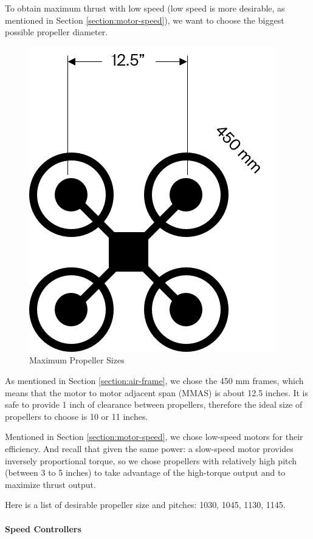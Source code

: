 To obtain maximum thrust with low speed (low speed is more desirable, as mentioned in Section \ref{section:motor-speed}), we want to choose the biggest possible propeller diameter.

\begin{figure}[H]
    \centering
    \includegraphics[scale=0.5]{img/framepropsize}
    \caption{Maximum Propeller Sizes}
    \label{fig:framepropsize}
\end{figure}

As mentioned in Section \ref{section:air-frame}, we chose the 450 mm frames, which means that the motor to motor 
adjacent span (MMAS) is about 12.5 inches. It is safe to provide 1 inch of clearance between propellers, 
therefore the ideal size of propellers to choose is 10 or 11 inches.

Mentioned in Section \ref{section:motor-speed}, we chose low-speed motors for their efficiency. And recall that 
given the same power: a slow-speed motor provides inversely proportional torque, so we chose propellers 
with relatively high pitch (between 3 to 5 inches) to take advantage of the high-torque output and to
maximize thrust output.

Here is a list of desirable propeller size and pitches: 1030, 1045, 1130, 1145.

\paragraph{Speed Controllers}

